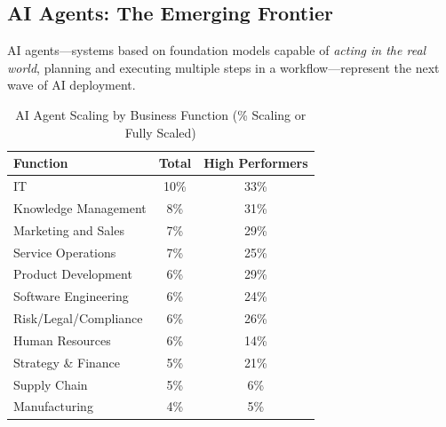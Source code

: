 \subsection{AI Agents: The Emerging Frontier}
\label{sec:vvv1-agents}

AI agents---systems based on foundation models capable of \textit{acting in the real world}, planning and executing multiple steps in a workflow---represent the next wave of AI deployment.

\begin{table}[htbp]
\centering
\caption{AI Agent Scaling by Business Function (\% Scaling or Fully Scaled)}
\label{tab:vvv1-agents}
\renewcommand{\arraystretch}{1.3}
\begin{tabular}{@{}lcc@{}}
\toprule
\textbf{Function} & \textbf{Total} & \textbf{High Performers} \\
\midrule
IT & 10\% & 33\% \\
Knowledge Management & 8\% & 31\% \\
Marketing and Sales & 7\% & 29\% \\
Service Operations & 7\% & 25\% \\
Product Development & 6\% & 29\% \\
Software Engineering & 6\% & 24\% \\
Risk/Legal/Compliance & 6\% & 26\% \\
Human Resources & 6\% & 14\% \\
Strategy \& Finance & 5\% & 21\% \\
Supply Chain & 5\% & 6\% \\
Manufacturing & 4\% & 5\% \\
\bottomrule
\end{tabular}
\end{table}

